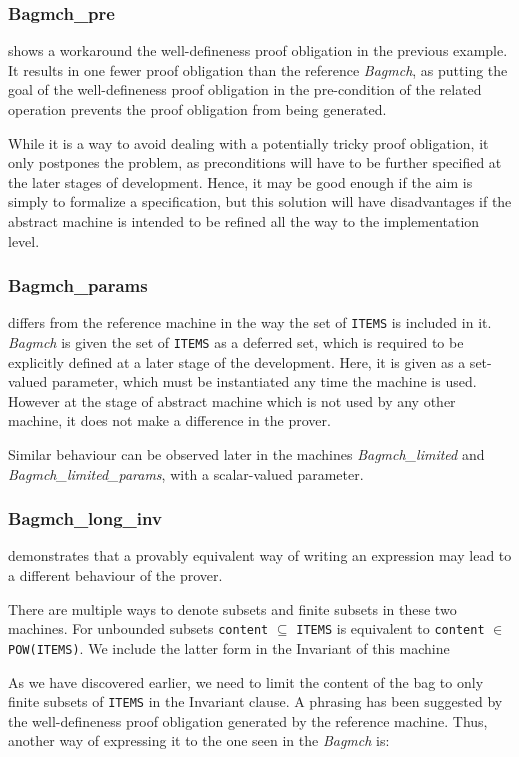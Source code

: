 \documentclass[11pt,journal]{IEEEtran}
\begin{document}
	\subsubsection{Bagmch\_pre} shows a workaround the well-defineness proof obligation in the previous example. It results in one fewer proof obligation than the reference \emph{Bagmch}, as putting the goal of the well-defineness proof obligation in the pre-condition of the related operation prevents the proof obligation from being generated.
	
	While it is a way to avoid dealing with a potentially tricky proof obligation, it only postpones the problem, as preconditions will have to be further specified at the later stages of development. Hence, it may be good enough if the aim is simply to formalize a specification, but this solution will have disadvantages if the abstract machine is intended to be refined all the way to the implementation level.
	
	\subsubsection{Bagmch\_params} differs from the reference machine in the way the set of \texttt{ITEMS} is included in it. \emph{Bagmch} is given the set of \texttt{ITEMS} as a deferred set, which is required to be explicitly defined at a later stage of the development. Here, it is given as a set-valued parameter, which must be instantiated any time the machine is used.\cite{b-method} However at the stage of abstract machine which is not used by any other machine, it does not make a difference in the prover.
	
	Similar behaviour can be observed later in the machines \emph{Bagmch\_limited} and \emph{Bagmch\_limited\_params}, with a scalar-valued parameter.
	
	\subsubsection{Bagmch\_long\_inv} demonstrates that a provably equivalent way of writing an expression may lead to a different behaviour of the prover. 
	
	There are multiple ways to denote subsets and finite subsets in these two machines. For unbounded subsets \texttt{content} $\subseteq$ \texttt{ITEMS} is equivalent to \texttt{content} $\in$ \texttt{POW(ITEMS)}. We include the latter form in the Invariant of this machine
	
	As we have discovered earlier, we need to limit the content of the bag to only finite subsets of \texttt{ITEMS} in the Invariant clause. A phrasing has been suggested by the well-defineness proof obligation generated by the reference machine. Thus, another way of expressing it to the one seen in the \emph{Bagmch} is:
	
\end{document}

